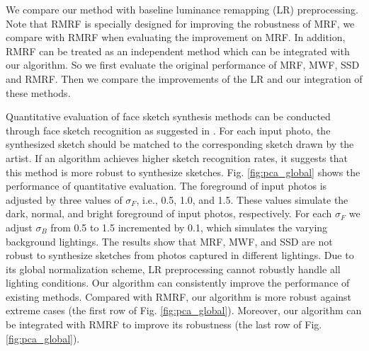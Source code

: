 \documentclass{article}
\begin{document}
We compare our method with baseline luminance remapping (LR) \cite{hertzmann-siggraph01-analogy} preprocessing. Note that RMRF is specially designed for improving the robustness of MRF, we compare with RMRF when evaluating the improvement on MRF. In addition, RMRF can be treated as an independent method which can be integrated with our algorithm. So we first evaluate the original performance of MRF, MWF, SSD and RMRF. Then we compare the improvements of the LR and our integration of these methods.

Quantitative evaluation of face sketch synthesis methods can be conducted through face sketch recognition as suggested in \cite{wang-pami2009-face}. For each input photo, the synthesized sketch should be matched to the corresponding sketch drawn by the artist. If an algorithm achieves higher sketch recognition rates, it suggests that this method is more robust to synthesize sketches. Fig. \ref{fig:pca_global} shows the performance of quantitative evaluation. The foreground of input photos is adjusted by three values of $\sigma_F$, i.e., 0.5, 1.0, and 1.5. These values simulate the dark, normal, and bright foreground of input photos, respectively. For each $\sigma_F$ we adjust $\sigma_B$ from 0.5 to 1.5 incremented by 0.1, which simulates the varying background lightings. The results show that MRF, MWF, and SSD are not robust to synthesize sketches from photos captured in different lightings. Due to its global normalization scheme, LR preprocessing cannot robustly handle all lighting conditions. Our algorithm can consistently improve the performance of existing methods. Compared with RMRF, our algorithm is more robust against extreme cases (the first row of Fig. \ref{fig:pca_global}). Moreover, our algorithm can be integrated with RMRF to improve its robustness (the last row of Fig. \ref{fig:pca_global}).
\end{document}
